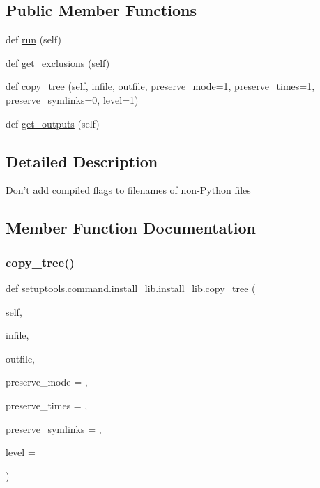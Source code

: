 \subsection*{Public Member Functions}
\begin{DoxyCompactItemize}
\item 
def \hyperlink{classsetuptools_1_1command_1_1install__lib_1_1install__lib_a72adda63714aa1fdf24bdf6e6a5ca9f3}{run} (self)
\item 
def \hyperlink{classsetuptools_1_1command_1_1install__lib_1_1install__lib_ac58d2f853233f9d3401b5f33617e5ac9}{get\+\_\+exclusions} (self)
\item 
def \hyperlink{classsetuptools_1_1command_1_1install__lib_1_1install__lib_a19149c83c5ca910718d921d2115af153}{copy\+\_\+tree} (self, infile, outfile, preserve\+\_\+mode=1, preserve\+\_\+times=1, preserve\+\_\+symlinks=0, level=1)
\item 
def \hyperlink{classsetuptools_1_1command_1_1install__lib_1_1install__lib_ad4d991a596e53854926b93293b5b48ca}{get\+\_\+outputs} (self)
\end{DoxyCompactItemize}


\subsection{Detailed Description}
\begin{DoxyVerb}Don't add compiled flags to filenames of non-Python files\end{DoxyVerb}
 

\subsection{Member Function Documentation}
\mbox{\label{classsetuptools_1_1command_1_1install__lib_1_1install__lib_a19149c83c5ca910718d921d2115af153}} 
\subsubsection{\texorpdfstring{copy\+\_\+tree()}{copy\_tree()}}
{\footnotesize\ttfamily def setuptools.\+command.\+install\+\_\+lib.\+install\+\_\+lib.\+copy\+\_\+tree (\begin{DoxyParamCaption}\item[{}]{self,  }\item[{}]{infile,  }\item[{}]{outfile,  }\item[{}]{preserve\+\_\+mode = {},  }\item[{}]{preserve\+\_\+times = {},  }\item[{}]{preserve\+\_\+symlinks = {},  }\item[{}]{level = {} }\end{DoxyParamCaption})}

